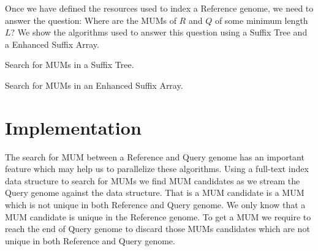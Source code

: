 \documentclass{acm_proc_article-sp}
\begin{document}
Once we have defined the resources used to index a Reference genome, we need to answer the question: Where are the MUMs of $R$ and $Q$ of some minimum length $L$? We show the algorithms used to answer this question using a Suffix Tree and a Enhanced Suffix Array.

\linesnumbered
\begin{algorithm}
  \dontprintsemicolon
  \Input{\R, \Q, \Len}
  \caption{Search for MUMs in a Suffix Tree.}
\end{algorithm}
\linesnumbered
\begin{algorithm}
  \dontprintsemicolon
  \Input{\R, \Q, \Len}
  \caption{Search for MUMs in an Enhanced Suffix Array.}
\end{algorithm}
\section{Implementation}
The search for MUM between a Reference and Query genome has an important feature which may help us to parallelize these algorithms. Using a full-text index data structure to search for MUMs we find MUM candidates as we stream the Query genome against the data structure. That is a MUM candidate is a MUM which is not unique in both Reference and Query genome. We only know that a MUM candidate is unique in the Reference genome. To get a MUM we require to reach the end of Query genome to discard those MUMs candidates which are not unique in both Reference and Query genome.
\end{document}
